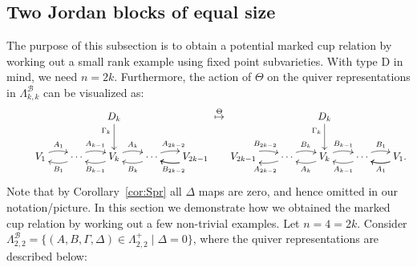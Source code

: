 \documentclass[11pt,reqno]{amsart}
\numberwithin{equation}{section}
\theoremstyle{definition}
\newcommand{\cB}{\mathcal{B}}
\begin{document}
\subsection{Two Jordan blocks of equal size}
The purpose of this subsection is to obtain a potential marked cup relation by working out a small rank example using fixed point subvarieties.
With type D in mind, we need $n=2k$. Furthermore, 
the action of $\Theta$ on the quiver representations in $\Lambda^\cB_{k,k}$ can be visualized as: 
\[ 
\xymatrix@C=18pt@R=9pt{
&
& &    
\ar[dd]_<(0.2){\Gamma_k}
D_k
& 
\\ & 
\\ 
&%
{V_1}  
	\ar@/^/[r]^{A_1} 
	& 
	\ar@/^/[l]^{B_1}
	\cdots
	\ar@/^/[r]^{A_{k-1}} 
	&   
	\ar@/^/[l]^{B_{k-1}} 
{V_k}  
	\ar@/^/[r]^{A_{k}}
	&   
	\ar@/^/[l]^{B_k}
	\cdots
	\ar@/^/[r]^{A_{2k-2}}
	&
	\ar@/^/[l]%
{V_{2k-1}} 
\ar@/^/[l]^{B_{2k-2}}  
}
\overset{\Theta}{\mapsto}
\xymatrix@C=18pt@R=9pt{
& &    
\ar[dd]_<(0.2){\Gamma_k}
D_k
  &
\\  
\\ 
{V_{2k-1}}  
	\ar@/^/[r]^{B_{2k-2}} 
	& 
	\ar@/^/[l]^{A_{2k-2}}
	\cdots
	\ar@/^/[r]^{B_{k}} 
	&   
	\ar@/^/[l]^{A_{k}} 
{V_k}  
	\ar@/^/[r]^{B_{k-1}}
	&   
	\ar@/^/[l]^{A_{k-1}}
	\cdots
	\ar@/^/[r]^{B_{1}}
	&
	\ar@/^/[l]%
{V_{1}.} 
\ar@/^/[l]^{A_{1}}  
}
\] 
Note that by Corollary~\ref{cor:Spr} all $\Delta$ maps are zero, and hence omitted in our notation/picture.
In this section we demonstrate how we obtained the marked cup relation by working out a few non-trivial examples.
\ex
Let $n=4=2k$.
Consider $\Lambda^\cB_{2,2} = \{ (A,B,\Gamma,\Delta) \in \Lambda^+_{2,2} \mid \Delta = 0\}$, where the quiver representations are described below: 
\end{document}
